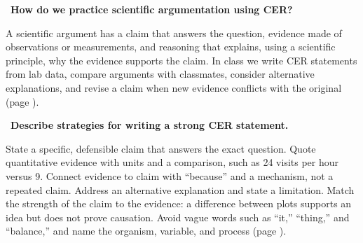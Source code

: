 \documentclass[11pt,letterpaper]{article}
\newcommand{\sq}[1]{\par\Needspace{6\baselineskip}\medskip{\color{forest}\textbf{Q.}}\ \textbf{#1}\par\smallskip}
\newcommand{\ans}[1]{#1\par}
\begin{document}
\sq{How do we practice scientific argumentation using CER?}
\ans{A scientific argument has a claim that answers the question, evidence made of observations or measurements, and reasoning that explains, using a scientific principle, why the evidence supports the claim. In class we write CER statements from lab data, compare arguments with classmates, consider alternative explanations, and revise a claim when new evidence conflicts with the original (page \pageref{cer}).}
\sq{Describe strategies for writing a strong CER statement.}
\ans{State a specific, defensible claim that answers the exact question. Quote quantitative evidence with units and a comparison, such as 24 visits per hour versus 9. Connect evidence to claim with ``because'' and a mechanism, not a repeated claim. Address an alternative explanation and state a limitation. Match the strength of the claim to the evidence: a difference between plots supports an idea but does not prove causation. Avoid vague words such as ``it,'' ``thing,'' and ``balance,'' and name the organism, variable, and process (page \pageref{cer}).}
\end{document}
